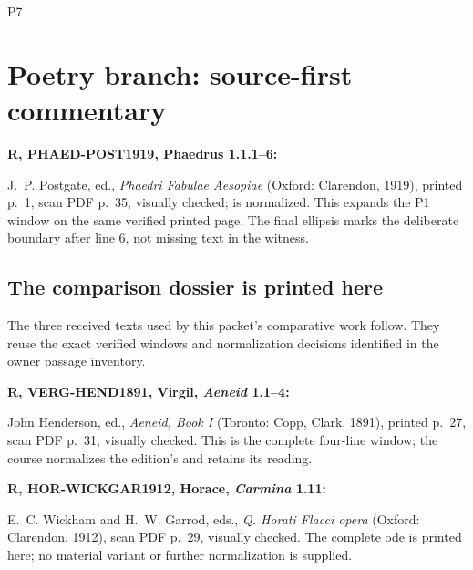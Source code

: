 \begin{courseunit}{P7}
\chapter{Poetry branch: source-first commentary}

\textbf{R, PHAED-POST1919, Phaedrus 1.1.1--6:}
\begin{quote}
\end{quote}

J.~P. Postgate, ed., \textit{Phaedri Fabulae Aesopiae} (Oxford: Clarendon,
1919), printed p.~1, scan PDF p.~35, visually checked;  is
normalized. This expands the P1 window on the same verified printed page. The
final ellipsis marks the deliberate boundary after line 6, not missing text in
the witness.

\section{The comparison dossier is printed here}

The three received texts used by this packet's comparative work follow.
They reuse the exact verified windows and normalization decisions identified
in the owner passage inventory.

\textbf{R, VERG-HEND1891, Virgil, \textit{Aeneid} 1.1--4:}
\begin{quote}
\PoetryVirgilAeneidOpening
\end{quote}
John Henderson, ed., \textit{Aeneid, Book I} (Toronto: Copp, Clark, 1891),
printed p.~27, scan PDF p.~31, visually checked. This is the complete
four-line window; the course normalizes the edition's  and retains
its  reading.

\textbf{R, HOR-WICKGAR1912, Horace, \textit{Carmina} 1.11:}
\begin{quote}
\PoetryHoraceCarminaOneEleven
\end{quote}
E.~C. Wickham and H.~W. Garrod, eds., \textit{Q. Horati Flacci opera}
(Oxford: Clarendon, 1912), scan PDF p.~29, visually checked. The complete ode
is printed here; no material variant or further normalization is supplied.


\end{courseunit}
